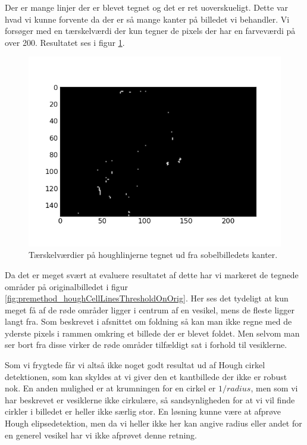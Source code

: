 Der er mange linjer der er blevet tegnet og det er ret uoverskueligt. Dette var hvad vi kunne forvente da der er så mange kanter på billedet vi behandler. Vi forsøger med en tærskelværdi der kun tegner de pixels der har en farveværdi på over 200. Resultatet ses i figur \ref{fig:premethod_houghCellLinesThreshold}.

\begin{figure}[H]
	\centering
	\includegraphics[scale=0.8]{files/premethod/img/houghthreshold.png}
	\caption{Tærskelværdier på houghlinjerne tegnet ud fra sobelbilledets kanter.\label{fig:premethod_houghCellLinesThreshold}}
\end{figure}

Da det er meget svært at evaluere resultatet af dette har vi markeret de tegnede områder på originalbilledet i figur \ref{fig:premethod_houghCellLinesThresholdOnOrig}. Her ses det tydeligt at kun meget få af de røde områder ligger i centrum af en vesikel, mens de fleste ligger langt fra. Som beskrevet i afsnittet om foldning så kan man ikke regne med de yderste pixels i rammen omkring et billede der er blevet foldet. Men selvom man ser bort fra disse virker de røde områder tilfældigt sat i forhold til vesiklerne.

Som vi frygtede får vi altså ikke noget godt resultat ud af Hough cirkel detektionen, som kan skyldes at vi giver den et kantbillede der ikke er robust nok. En anden mulighed er at krumningen for en cirkel er $1/radius$, men som vi har beskrevet er vesiklerne ikke cirkulære, så sandsynligheden for at vi vil finde cirkler i billedet er heller ikke særlig stor. En løsning kunne være at afprøve Hough elipsedetektion, men da vi heller ikke her kan angive radius eller andet for en generel vesikel har vi ikke afprøvet denne retning.

